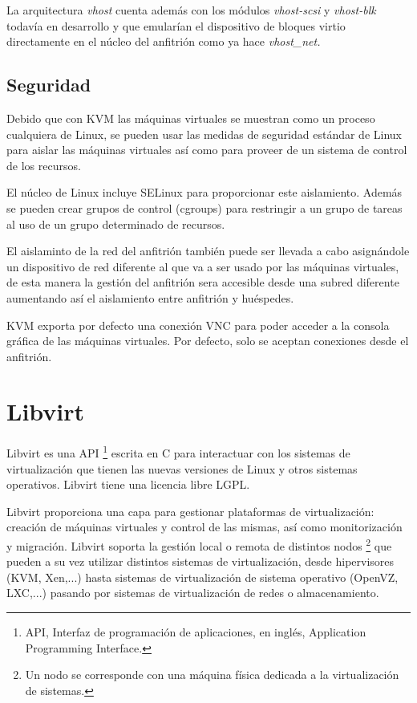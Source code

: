 \documentclass[spanisheDIVcalc,twoside,parskip-,pointlessnumbers,final]{scrbook}
\begin{document}
La arquitectura \emph{vhost }cuenta además con los módulos \emph{vhost-scsi
}y \emph{vhost-blk }todavía en desarrollo y que emularían el dispositivo
de bloques virtio directamente en el núcleo del anfitrión como ya
hace \emph{vhost\_net.}


\subsection{Seguridad}

Debido que con KVM las máquinas virtuales se muestran como un proceso
cualquiera de Linux, se pueden usar las medidas de seguridad estándar
de Linux para aislar las máquinas virtuales así como para proveer
de un sistema de control de los recursos. 

El núcleo de Linux incluye SELinux para proporcionar este aislamiento.
Además se pueden crear grupos de control (cgroups) para restringir
a un grupo de tareas al uso de un grupo determinado de recursos.

El aislaminto de la red del anfitrión también puede ser llevada a
cabo asignándole un dispositivo de red diferente al que va a ser usado
por las máquinas virtuales, de esta manera la gestión del anfitrión
sera accesible desde una subred diferente aumentando así el aislamiento
entre anfitrión y huéspedes. 

KVM exporta por defecto una conexión VNC para poder acceder a la consola
gráfica de las máquinas virtuales. Por defecto, solo se aceptan conexiones
desde el anfitrión.


\section{Libvirt}

Libvirt es una API%
\footnote{API, Interfaz de programación de aplicaciones, en inglés, Application
Programming Interface.%
} escrita en C para interactuar con los sistemas de virtualización
que tienen las nuevas versiones de Linux y otros sistemas operativos.
Libvirt tiene una licencia libre LGPL.

Libvirt proporciona una capa para gestionar plataformas de virtualización:
creación de máquinas virtuales y control de las mismas, así como monitorización
y migración. Libvirt soporta la gestión local o remota de distintos
nodos%
\footnote{Un nodo se corresponde con una máquina física dedicada a la virtualización
de sistemas.%
} que pueden a su vez utilizar distintos sistemas de virtualización,
desde hipervisores (KVM, Xen,...) hasta sistemas de virtualización
de sistema operativo (OpenVZ, LXC,...) pasando por sistemas de virtualización
de redes o almacenamiento.
\end{document}
